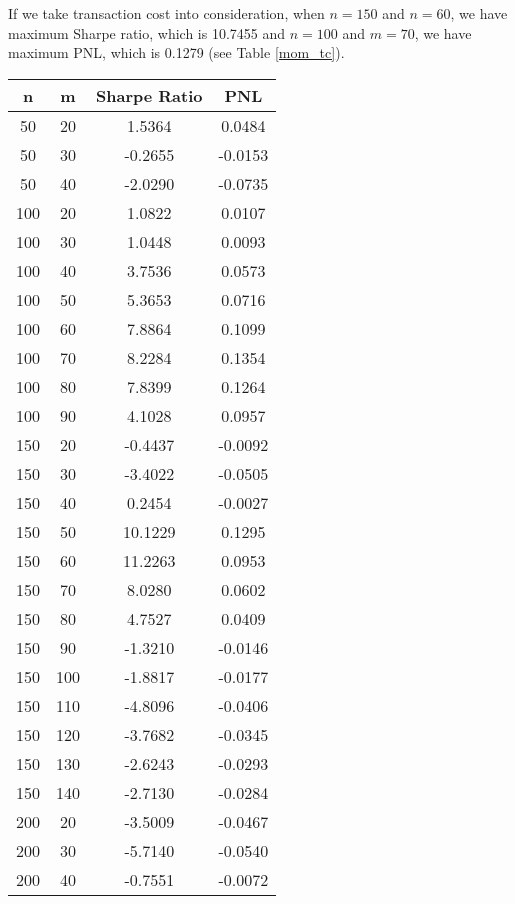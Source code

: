 \documentclass[11pt]{article}
\begin{document}
If we take transaction cost into consideration,  when $n=150$ and $n=60$, we have maximum Sharpe ratio, which is 10.7455 and $n=100$ and $m=70$, we have maximum PNL, which is 0.1279 (see Table \ref{mom_tc}).

\begin{center}
\begin{longtable}{cccc}
  \hline
n & m & Sharpe Ratio & PNL \\ 
  \hline
   50 &    20 & 1.5364 & 0.0484 \\ 
     50 &    30 & -0.2655 & -0.0153 \\ 
     50 &    40 & -2.0290 & -0.0735 \\ 
    100 &    20 & 1.0822 & 0.0107 \\ 
    100 &    30 & 1.0448 & 0.0093 \\ 
    100 &    40 & 3.7536 & 0.0573 \\ 
    100 &    50 & 5.3653 & 0.0716 \\ 
    100 &    60 & 7.8864 & 0.1099 \\ 
    100 &    70 & 8.2284 & 0.1354 \\ 
    100 &    80 & 7.8399 & 0.1264 \\ 
    100 &    90 & 4.1028 & 0.0957 \\ 
    150 &    20 & -0.4437 & -0.0092 \\ 
    150 &    30 & -3.4022 & -0.0505 \\ 
    150 &    40 & 0.2454 & -0.0027 \\ 
    150 &    50 & 10.1229 & 0.1295 \\ 
    150 &    60 & 11.2263 & 0.0953 \\ 
    150 &    70 & 8.0280 & 0.0602 \\ 
    150 &    80 & 4.7527 & 0.0409 \\ 
    150 &    90 & -1.3210 & -0.0146 \\ 
    150 &   100 & -1.8817 & -0.0177 \\ 
    150 &   110 & -4.8096 & -0.0406 \\ 
    150 &   120 & -3.7682 & -0.0345 \\ 
    150 &   130 & -2.6243 & -0.0293 \\ 
    150 &   140 & -2.7130 & -0.0284 \\ 
    200 &    20 & -3.5009 & -0.0467 \\ 
    200 &    30 & -5.7140 & -0.0540 \\ 
    200 &    40 & -0.7551 & -0.0072 \\ 

\end{longtable}
\end{center}
\end{document}
